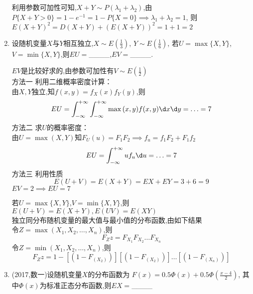 \documentclass[12pt, a4paper, oneside, UTF8]{ctexbook}
\begin{document}
\begin{enumerate}[label=\arabic*.]
    \begin{solution}
    利用参数可加性可知,$X+Y\sim P(\lambda_1+\lambda_2)$,由$P\{X+Y>0\}=1-e^{-1}=1-P\{X=0\}\implies \lambda_1+\lambda_2=1$,
    则$E(X+Y)^2=D(X+Y)+(E(X+Y))^2=1+1=2$
    \end{solution}
    
    \item 设随机变量$X$与$Y$相互独立,$X\sim E(\frac{1}{3})$,
    $Y\sim E\left(\frac{1}{6}\right)$, 若$U=\max\{X,Y\}$,
    \\$V=\min\{X,Y\}$,则$EU=$\_\_\_\_,$EV=$\_\_\_\_.
    
    \begin{solution}
    $EV$是比较好求的,由参数可加性有$V\sim E(\frac{1}{2})$ \\
    方法一 利用二维概率密度计算：\\
    由$X,Y$独立,知$f(x,y)=f_{X}(x)f_{Y}(y)$,则
    \[
    EU=\int_{-\infty}^{+\infty}\int_{-\infty}^{+\infty}\max{(x,y)}f(x,y)\d x\d y = \ldots = 7
    \]
    方法二 求$U$的概率密度：\\
    由$U=\max{(X,Y)}$知$F_{U}(u)=F_1F_2\implies f_{u}=f_1F_2+F_1f_2$ 
    \[
    EU=\int_{-\infty}^{+\infty}uf_{u}\d u=\ldots=7
    \]
    方法三 利用性质 \\
    \[
    E(U+V)=E(X+Y)=EX+EY=3+6=9
    \]
    $EV=2\implies EU=7$
    \end{solution}
    
    \begin{tcolorbox}[title=总结]
        若$U=\max\{X,Y\}$,$V=\min\{X,Y\}$,则$E(U+V)=E(X+Y),E(UV)=E(XY)$ \\
        独立同分布随机变量的最大值与最小值的分布函数,由如下结果\\
        令$Z=\max{(X_1,X_2,\ldots,X_n)}$,则
        \[
        F_Z{z}=F_{X_1}F_{X_2}\ldots F_{X_n}
        \]
        令$Z=\min{(X_1,X_2,\ldots,X_n)}$,则
        \[
        F_Z{z}=1-[(1-F_{(X_2)})][(1-F_{(X_2)})]\ldots[(1-F_{(X_n)})]
        \]
    \end{tcolorbox}
    \item (2017,数一)设随机变量$X$的分布函数为
    $F(x)=0.5\Phi(x)+0.5\Phi\left(\frac{x-4}{2}\right)$,
    其中$\Phi(x)$为标准正态分布函数,则$EX=$\_\_\_\_
    
    

\end{enumerate}
\end{document}
